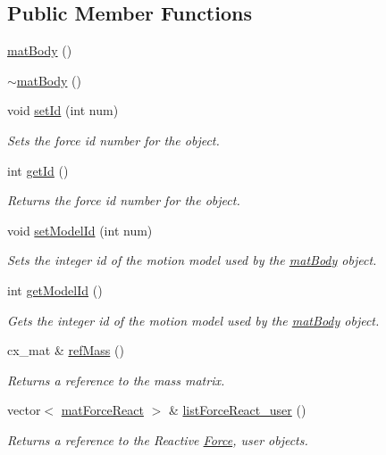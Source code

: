 \subsection*{Public Member Functions}
\begin{DoxyCompactItemize}
\item 
\hyperlink{classmat_body_adbcb73fc9873660ca781493b2b2742a2}{mat\-Body} ()
\item 
\hyperlink{classmat_body_afcc3a6a87689dfbb5dfa72648a46c355}{$\sim$mat\-Body} ()
\item 
void \hyperlink{classmat_body_abb86318fbd7300ed01eae308551f9e96}{set\-Id} (int num)
\begin{DoxyCompactList}\small\item\em Sets the force id number for the object. \end{DoxyCompactList}\item 
int \hyperlink{classmat_body_a551183ad56eeba71ea4690574b1841e4}{get\-Id} ()
\begin{DoxyCompactList}\small\item\em Returns the force id number for the object. \end{DoxyCompactList}\item 
void \hyperlink{classmat_body_abb8ea32c84153da5dfc53d7b0dc836a5}{set\-Model\-Id} (int num)
\begin{DoxyCompactList}\small\item\em Sets the integer id of the motion model used by the \hyperlink{classmat_body}{mat\-Body} object. \end{DoxyCompactList}\item 
int \hyperlink{classmat_body_ae4c339b7ce6a93cf6e54bc998cbd5903}{get\-Model\-Id} ()
\begin{DoxyCompactList}\small\item\em Gets the integer id of the motion model used by the \hyperlink{classmat_body}{mat\-Body} object. \end{DoxyCompactList}\item 
cx\-\_\-mat \& \hyperlink{classmat_body_a7c0b44be2aa75ae270168849c06e6067}{ref\-Mass} ()
\begin{DoxyCompactList}\small\item\em Returns a reference to the mass matrix. \end{DoxyCompactList}\item 
vector$<$ \hyperlink{classmat_force_react}{mat\-Force\-React} $>$ \& \hyperlink{classmat_body_aeb296f7c56b523b32ca12b58de56ef37}{list\-Force\-React\-\_\-user} ()
\begin{DoxyCompactList}\small\item\em Returns a reference to the Reactive \hyperlink{class_force}{Force}, user objects. \end{DoxyCompactList}\item 

\end{DoxyCompactItemize}
